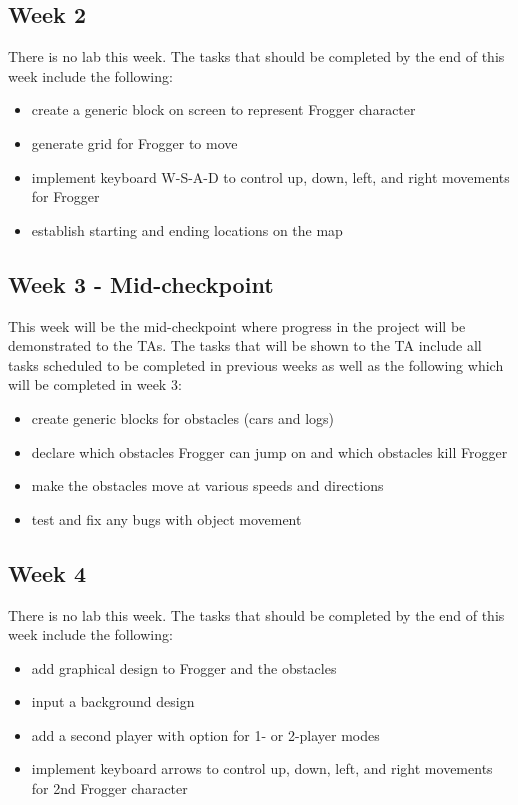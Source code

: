 \documentclass[journal, twocolumn, final,11pt,letterpaper]{IEEEtran}
\begin{document}
\subsection{Week 2}
There is no lab this week.  The tasks that should be completed by the end of this week include the following:

\begin{itemize}
	\item create a generic block on screen to represent Frogger character
	\item generate grid for Frogger to move
	\item implement keyboard W-S-A-D to control up, down, left, and right movements for Frogger 
	\item establish starting and ending locations on the map 
\end{itemize}

\subsection{Week 3 - Mid-checkpoint}
This week will be the mid-checkpoint where progress in the project will be demonstrated to the TAs.  The tasks that will be shown to the TA include all tasks scheduled to be completed in previous weeks as well as the following which will be completed in week 3: 
\begin{itemize}
	\item create generic blocks for obstacles (cars and logs) 
	\item declare which obstacles Frogger can jump on and which obstacles kill Frogger
	\item make the obstacles move at various speeds and directions
	\item test and fix any bugs with object movement
\end{itemize}

\subsection{Week 4} 
There is no lab this week. The tasks that should be completed by the end of this week include the following: 
\begin{itemize}
	\item add graphical design to Frogger and the obstacles
	\item input a background design
	\item add a second player with option for 1- or 2-player modes
	\item implement keyboard arrows to control up, down, left, and right movements for 2nd Frogger character

\end{itemize}
\end{document}
